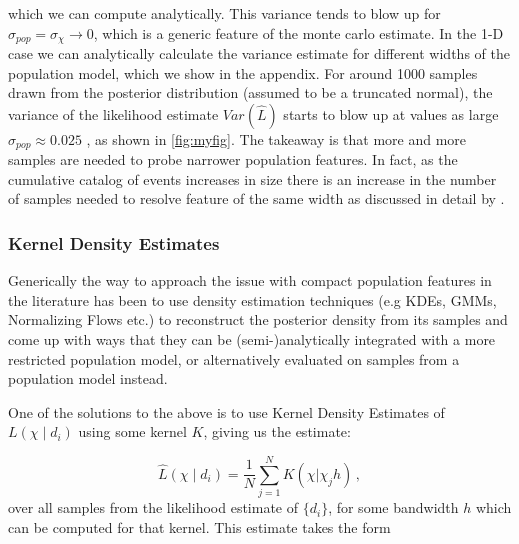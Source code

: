 \documentclass[twocolumn,usenames,dvipsnames,linenumbers]{aastex631}
\newcommand{\asad}[1]{\textcolor{olive}{AH: #1}}
\begin{document}
which we can compute analytically. This variance tends to blow up for $\sigma_{pop} = \sigma_{\chi} \to 0$, which is a generic feature of the monte carlo estimate. In the 1-D case we can analytically calculate the variance estimate for different widths of the population model, which we show in the appendix. For around 1000 samples drawn from the posterior distribution (assumed to be a truncated normal), the variance of the likelihood estimate $Var(\hat{L})$ starts to blow up at values as large $\sigma_{pop} \approx 0.025$ ,  as shown in  \autoref{fig:myfig}. The takeaway is that more and more samples are needed to probe narrower population features. In fact, as the cumulative catalog of events increases in size there is an increase in the number of samples needed to resolve feature of the same width as discussed in detail by \cite{Talbot2023}. 


\subsubsection{Kernel Density Estimates}
\label{sec:IllustrativeExample-KDE}
Generically the way to approach the issue with compact population features in the literature has been to use density estimation techniques (e.g KDEs, GMMs, Normalizing Flows etc.) to reconstruct the posterior density from its samples and come up with ways that they can be (semi-)analytically integrated with a more restricted population model, or alternatively evaluated on samples from a population model instead. 

One of the solutions to the above is to use Kernel Density Estimates of $L(\chi \mid d_i)$ using some kernel $K$, giving us the estimate:

\begin{equation}
	\hat{L}(\chi \mid d_i) = \frac{1}{N}\sum_{j=1}^N K(\chi  | \chi_j h)\,,
\end{equation} 
over all samples from the likelihood estimate of $\{d_i\}$, for some bandwidth $h$ which can be computed for that kernel. This estimate takes the form
\end{document}
